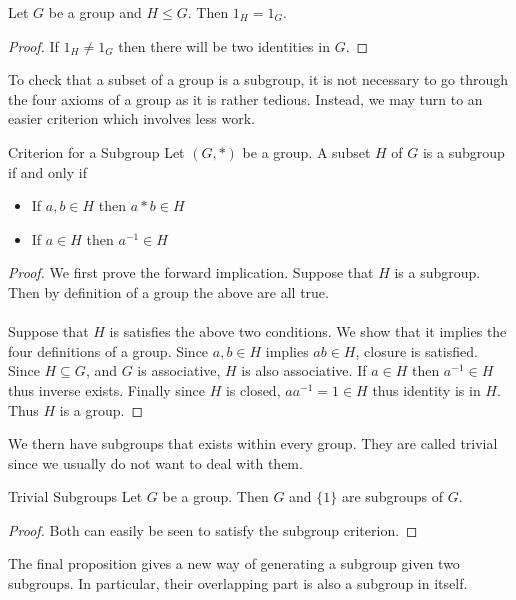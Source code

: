 \documentclass[a4paper]{article}
\begin{document}
\begin{lmm}{}{} Let $G$ be a group and $H\leq G$. Then $1_H=1_G$. \tcbline
\begin{proof}
If $1_H\neq 1_G$ then there will be two identities in $G$. 
\end{proof}
\end{lmm}

To check that a subset of a group is a subgroup, it is not necessary to go through the four axioms of a group as it is rather tedious. Instead, we may turn to an easier criterion which involves less work. 

\begin{thm}{Criterion for a Subgroup}{} Let $(G,\ast)$ be a group. A subset $H$ of $G$ is a subgroup if and only if 
\begin{itemize}
\item If $a,b\in H$ then $a\ast b\in H$
\item If $a\in H$ then $a^{-1}\in H$
\end{itemize}\tcbline
\begin{proof} We first prove the forward implication. Suppose that $H$ is a subgroup. Then by definition of a group the above are all true.\\~\\
Suppose that $H$ is satisfies the above two conditions. We show that it implies the four definitions of a group. Since $a,b\in H$ implies $ab\in H$, closure is satisfied. Since $H\subseteq G$, and $G$ is associative, $H$ is also associative. If $a\in H$ then $a^{-1}\in H$ thus inverse exists. Finally since $H$ is closed, $aa^{-1}=1\in H$ thus identity is in $H$. Thus $H$ is a group. 
\end{proof}
\end{thm}

We thern have subgroups that exists within every group. They are called trivial since we usually do not want to deal with them. 

\begin{lmm}{Trivial Subgroups}{} Let $G$ be a group. Then $G$ and $\{1\}$ are subgroups of $G$. \tcbline
\begin{proof} Both can easily be seen to satisfy the subgroup criterion. 
\end{proof}
\end{lmm}

The final proposition gives a new way of generating a subgroup given two subgroups. In particular, their overlapping part is also a subgroup in itself. 
\end{document}

